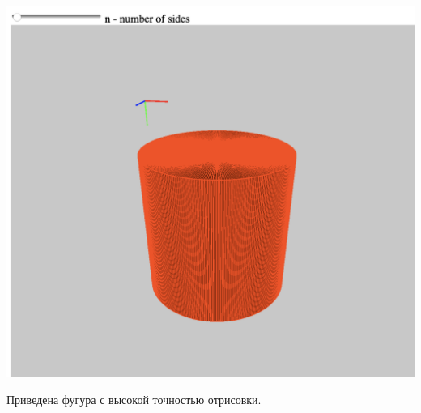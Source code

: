 \includegraphics[scale=0.4]{pictures/2.png}

Приведена фугура с высокой точностью отрисовки.







